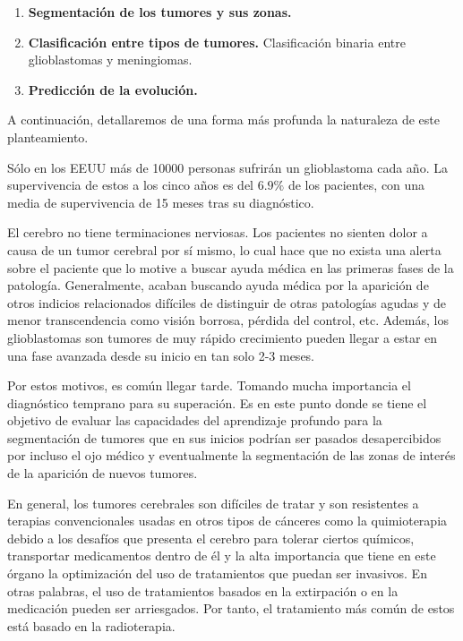 \begin{enumerate}
	\item \textbf{Segmentación de los tumores y sus zonas.}  
	\item \textbf{Clasificación entre tipos de tumores.} Clasificación binaria entre glioblastomas y meningiomas.
	
	\item \textbf{Predicción de la evolución.}
\end{enumerate}

A continuación, detallaremos de una forma más profunda la naturaleza de este planteamiento.

Sólo en los EEUU más de 10000 personas sufrirán un glioblastoma cada año. La supervivencia de estos a los cinco años es del $6.9 \%$ de los pacientes, con una media de supervivencia de 15 meses tras su diagnóstico.

El cerebro no tiene terminaciones nerviosas. Los pacientes no sienten dolor a causa de un tumor cerebral por sí mismo, lo cual hace que no exista una alerta sobre el paciente que lo motive a buscar ayuda médica en las primeras fases de la patología. Generalmente, acaban buscando ayuda médica por la aparición de otros indicios relacionados difíciles de distinguir de otras patologías agudas y de menor transcendencia como visión borrosa, pérdida del control, etc. Además, los glioblastomas son tumores de muy rápido crecimiento pueden llegar a estar en una fase avanzada desde su inicio en tan solo 2-3 meses.

Por estos motivos, es común llegar tarde. Tomando mucha importancia el diagnóstico temprano para su superación. Es en este punto donde se tiene el objetivo de evaluar las capacidades del aprendizaje profundo para la segmentación de tumores que en sus inicios podrían ser pasados desapercibidos por incluso el ojo médico y eventualmente la segmentación de las zonas de interés de la aparición de nuevos tumores.

En general, los tumores cerebrales son difíciles de tratar y son resistentes a terapias convencionales usadas en otros tipos de cánceres como la quimioterapia debido a los desafíos que presenta el cerebro para tolerar ciertos químicos, transportar medicamentos dentro de él y la alta importancia que tiene en este órgano la optimización del uso de tratamientos que puedan ser invasivos. En otras palabras, el uso de tratamientos basados en la extirpación o en la medicación pueden ser arriesgados. Por tanto, el tratamiento más común de estos está basado en la radioterapia.

